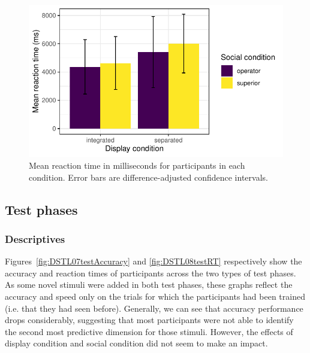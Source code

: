 \documentclass[doc, a4paper, apacite]{apa6}
\begin{document}
\begin{figure}
	\centering
	\includegraphics{images/DSTL07learningRT}
	\caption{Mean reaction time in milliseconds for participants in each condition. Error bars are difference-adjusted confidence intervals.}
	\label{fig:DSTL07learningRT}
\end{figure}

\subsection{Test phases}

\subsubsection{Descriptives}
Figures~\ref{fig:DSTL07testAccuracy} and \ref{fig:DSTL08testRT} respectively show the accuracy and reaction times of participants across the two types of test phases.
As some novel stimuli were added in both test phases, these graphs reflect the accuracy and speed only on the trials for which the participants had been trained (i.e. that they had seen before). 
Generally, we can see that accuracy performance drops considerably, suggesting that most participants were not able to identify the second most predictive dimension for those stimuli. 
However, the effects of display condition and social condition did not seem to make an impact. 
\end{document}
